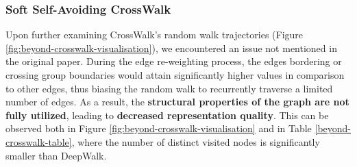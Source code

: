 \begin{table}
    \centering
    \caption{Quantitative comparison of the discussed node representation methodologies on three datasets. The average number of crossings (\textit{avg. cross.}) indicates the mean number of times the random walk has crossed a group boundary throughout training. The visited percentage (\textit{\% vis.}) represents the  fraction of distinct nodes visited in a path throughout training. Finally, the \textit{node classification} accuracy is reported for each method for the Rice-Facebook dataset. Our proposed method is highlighted with a heavier (bolded) font.}
    \label{beyond-crosswalk-table}
\end{table}





\subsubsection{Soft Self-Avoiding CrossWalk}

Upon further examining CrossWalk's random walk trajectories (Figure \ref{fig:beyond-crosswalk-visualisation}), we encountered an issue not mentioned in the original paper. During the edge re-weighting process, the edges bordering or crossing group boundaries would attain significantly higher values in comparison to other edges, thus biasing the random walk to recurrently traverse a limited number of edges. As a result, the \textbf{structural properties of the graph are not fully utilized}, leading to \textbf{decreased representation quality}. This can be observed both in Figure \ref{fig:beyond-crosswalk-visualisation} and in Table \ref{beyond-crosswalk-table}, where the number of distinct visited nodes is significantly smaller than DeepWalk. \\

